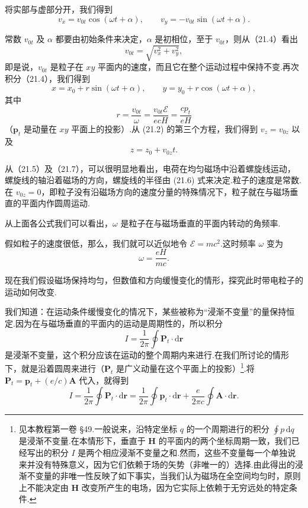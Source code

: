 将实部与虚部分开，我们得到
\begin{equation}
  v_x=v_{0t}\cos(\omega t+\alpha),\qquad
  v_y=-v_{0t}\sin(\omega t+\alpha).
\end{equation}

常数 $v_{0t}$ 及 $\alpha$ 都要由初始条件来决定，$\alpha$ 是初相位，至于 $v_{0t}$，则从（21.4）看出
\begin{equation*}
  v_{0t}=\sqrt{v_x^2+v_y^2},
\end{equation*}
即是说，$v_{0t}$ 是粒子在 $xy$ 平面内的速度，而且它在整个运动过程中保持不变.再次积分（21.4），我们得到
\begin{equation}
  x=x_0+r\sin(\omega t+\alpha),\qquad
  y=y_0+r\cos(\omega t+\alpha),
\end{equation}
其中
\begin{equation}
  r=\frac{v_{0t}}{\omega}=\frac{v_{0t}\mathcal{E}}{ecH}=\frac{cp_t}{eH}
\end{equation}
（$\boldsymbol{p}_t$ 是动量在 $xy$ 平面上的投影）.从 (21.2) 的第三个方程，我们得到
$v_z=v_{0z}$ 以及
\begin{equation}
  z=z_0+v_{0z}t.
\end{equation}

从（21.5）及（21.7），可以很明显地看出，电荷在均匀磁场中沿着螺旋线运动，螺旋线的轴沿着磁场的方向，螺旋线的半径由 (21.6) 式来决定.粒子的速度是常数.在
$v_{0z}=0$，即粒子没有沿磁场方向的速度分量的特殊情况下，粒子就在与磁场垂直的平面内作圆周运动.

从上面各公式我们可以看出，$\omega$ 是粒子在与磁场垂直的平面内转动的角频率.

假如粒子的速度很低，那么，我们就可以近似地令 $\mathcal{E}=mc^2$.这时频率 $\omega$ 变为
\begin{equation}
  \omega=\frac{eH}{mc}.
\end{equation}

现在我们假设磁场保持均匀，但数值和方向缓慢变化的情形，探究此时带电粒子的运动如何改变.

我们知道：在运动条件缓慢变化的情况下，某些被称为“浸渐不变量”的量保持恒定.因为在与磁场垂直的平面内的运动是周期性的，所以积分
\begin{equation*}
  I=\frac{1}{2\pi}\oint\boldsymbol{P}_t\cdot\mathrm{d}\boldsymbol{r}
\end{equation*}
是浸渐不变量，这个积分应该在运动的整个周期内来进行.在我们所讨论的情形下，就是沿着圆周来进行（$\boldsymbol{P}_t$
是广义动量在这个平面上的投影）\footnote{见本教程第一卷 §49.一般说来，沿特定坐标 $q$ 的一个周期进行的积分 $\oint p\,\mathrm{d}q$ 是浸渐不变量.在本情形下，垂直于 $\boldsymbol{H}$ 的平面内的两个坐标周期一致，我们已经写出的积分 $I$ 是两个相应浸渐不变量之和.然而，这些不变量每一个单独说来并没有特殊意义，因为它们依赖于场的矢势（非唯一的）选择.由此得出的浸渐不变量的非唯一性反映了如下事实，当我们认为磁场在全空间均匀时，原则上不能决定由 $\boldsymbol{H}$ 改变所产生的电场，因为它实际上依赖于无穷远处的特定条件.}.将
$\boldsymbol{P}_t=\boldsymbol{p}_t+(e/c)\boldsymbol{A}$ 代入，就得到
\begin{equation*}
  I=\frac{1}{2\pi}\oint\boldsymbol{P}_t\cdot\mathrm{d}\boldsymbol{r}
  =\frac{1}{2\pi}\oint\boldsymbol{p}_t\cdot\mathrm{d}\boldsymbol{r}
  +\frac{e}{2\pi c}\oint\boldsymbol{A}\cdot\mathrm{d}\boldsymbol{r}.
\end{equation*}

